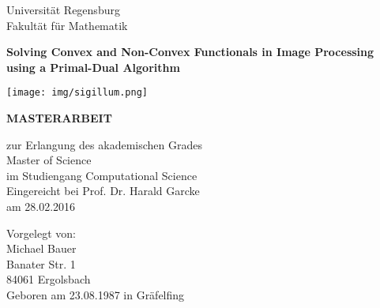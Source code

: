 
\begin{titlepage} %

    \begin{center}
        \begin{Large}
            Universit\"at Regensburg\\
            Fakult\"at f\"ur Mathematik\\
        \end{Large}
        \vspace{0.5cm}
        \begin{huge}
            \textbf{Solving Convex and Non-Convex Functionals in Image Processing using a Primal-Dual Algorithm}
        \end{huge}
        \vspace{0.5cm}
        \begin{center}
        \texttt{[image: img/sigillum.png]}
        \vspace{0.5cm}\\
        \begin{Large}
            \textbf{MASTERARBEIT}\\
        \end{Large}
        \vspace{0.5cm}
        \begin{large}
            zur Erlangung des akademischen Grades\\
            Master of Science\\
            im Studiengang Computational Science\\
            \vspace{0.5cm}
            Eingereicht bei Prof. Dr. Harald Garcke\\
            am 28.02.2016
        \end{large}
        \vspace{0.5cm}
    \end{center}

    \begin{flushleft}
        \begin{large}
            Vorgelegt von:\\
            Michael Bauer\\
            Banater Str. 1\\
            84061 Ergolsbach\\
            Geboren am 23.08.1987 in Gr\"afelfing
        \end{large}
    \end{flushleft}

    \end{center}

\end{titlepage}

\newpage